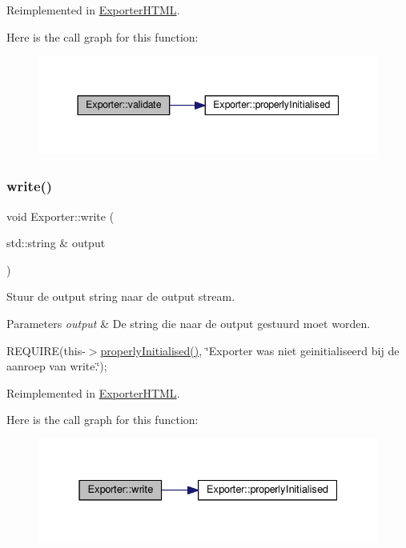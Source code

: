 Reimplemented in \hyperlink{class_exporter_h_t_m_l_a60518b938e3cddd92ce3218de3651ac4}{Exporter\+H\+T\+ML}.

Here is the call graph for this function\+:
\nopagebreak
\begin{figure}[H]
\begin{center}
\leavevmode
\includegraphics[width=344pt]{class_exporter_a190fe737bcda2a55707ae51b731d11a5_cgraph}
\end{center}
\end{figure}
\mbox{\label{class_exporter_ac095b6486da16ffc76539f8c6c67be70}} 
\subsubsection{\texorpdfstring{write()}{write()}}
{\footnotesize\ttfamily void Exporter\+::write (\begin{DoxyParamCaption}\item[{std\+::string \&}]{output }\end{DoxyParamCaption})\hspace{0.3cm}{\ttfamily [virtual]}}



Stuur de output string naar de output stream. 


\begin{DoxyParams}{Parameters}
{\em output} & De string die naar de output gestuurd moet worden.\\
\hline
\end{DoxyParams}
R\+E\+Q\+U\+I\+RE(this-\/$>$\hyperlink{class_exporter_aafd9df9210aeefd7bb7fd434fc317cf0}{properly\+Initialised()}, \char`\"{}\+Exporter was niet geinitialiseerd bij de aanroep van write.\char`\"{});~\newline


Reimplemented in \hyperlink{class_exporter_h_t_m_l_aa5b12621501f09a9a082e9337fbf943c}{Exporter\+H\+T\+ML}.

Here is the call graph for this function\+:
\nopagebreak
\begin{figure}[H]
\begin{center}
\leavevmode
\includegraphics[width=331pt]{class_exporter_ac095b6486da16ffc76539f8c6c67be70_cgraph}
\end{center}
\end{figure}


